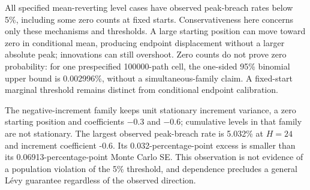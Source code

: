 \documentclass[10pt,a4paper]{article}
\begin{document}
All specified mean-reverting level cases have observed peak-breach rates below 5\%, including some zero counts at fixed starts. Conservativeness here concerns only these mechanisms and thresholds. A large starting position can move toward zero in conditional mean, producing endpoint displacement without a larger absolute peak; innovations can still overshoot. Zero counts do not prove zero probability: for one prespecified 100000-path cell, the one-sided 95\% binomial upper bound is 0.002996\%, without a simultaneous-family claim. A fixed-start marginal threshold remains distinct from conditional endpoint calibration.

The negative-increment family keeps unit stationary increment variance, a zero starting position and coefficients \(-\)0.3 and \(-\)0.6; cumulative levels in that family are not stationary. The largest observed peak-breach rate is 5.032\% at \(H=24\) and increment coefficient -0.6. Its 0.032-percentage-point excess is smaller than its 0.06913-percentage-point Monte Carlo SE. This observation is not evidence of a population violation of the 5\% threshold, and dependence precludes a general Lévy guarantee regardless of the observed direction.
\end{document}
